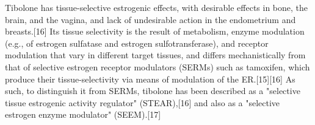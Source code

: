 Tibolone has tissue-selective estrogenic effects, with desirable effects in bone, the brain, and the vagina, and lack of undesirable action in the endometrium and breasts.[16] Its tissue selectivity is the result of metabolism, enzyme modulation (e.g., of estrogen sulfatase and estrogen sulfotransferase), and receptor modulation that vary in different target tissues, and differs mechanistically from that of selective estrogen receptor modulators (SERMs) such as tamoxifen, which produce their tissue-selectivity via means of modulation of the ER.[15][16] As such, to distinguish it from SERMs, tibolone has been described as a "selective tissue estrogenic activity regulator" (STEAR),[16] and also as a "selective estrogen enzyme modulator" (SEEM).[17]

